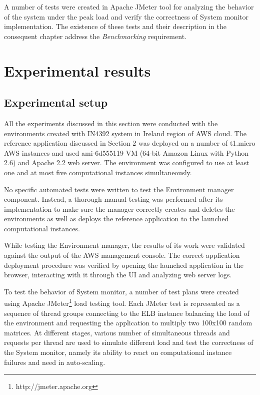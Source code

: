\documentclass[conference]{IEEEtran}
\begin{document}
A number of tests were created in Apache JMeter tool for analyzing the behavior of the system under the peak load and verify the correctness of System monitor implementation. The existence of these tests and their description in the consequent chapter address the \emph{Benchmarking} requirement.

\section{Experimental results}

\subsection{Experimental setup}

All the experiments discussed in this section were conducted with the environments created with IN4392 system in Ireland region of AWS cloud. The reference application discussed in Section 2 was deployed on a number of t1.micro AWS instances and used ami-6d555119 VM (64-bit Amazon Linux with Python 2.6) and Apache 2.2 web server. The environment was configured to use at least one and at most five computational instances simultaneously.

No specific automated tests were written to test the Environment manager component. Instead, a thorough manual testing was performed after its implementation to make sure the manager correctly creates and deletes the environments as well as deploys the reference application to the launched computational instances.

While testing the Environment manager, the results of its work were validated against the output of the AWS management console. The correct application deployment procedure was verified by opening the launched application in the browser, interacting with it through the UI and analyzing web server logs. 

To test the behavior of System monitor, a number of test plans were created using Apache JMeter\footnote{http://jmeter.apache.org} load testing tool. Each JMeter test is represented as a sequence of thread groups connecting to the ELB instance balancing the load of the environment and requesting the application to multiply two 100x100 random matrices. At different stages, various number of simultaneous threads and requests per thread are used to simulate different load and test the correctness of the System monitor, namely its ability to react on computational instance failures and need in auto-scaling.
\end{document}
